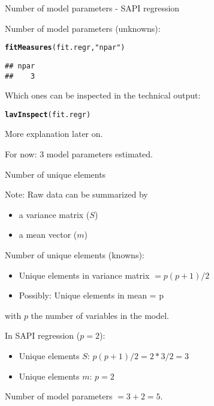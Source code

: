 \documentclass[10pt]{beamer}\usepackage[]{graphicx}\usepackage[]{xcolor}
\makeatletter
\newcommand{\hlstr}[1]{\textcolor[rgb]{0.192,0.494,0.8}{#1}}%
\newcommand{\hlstd}[1]{\textcolor[rgb]{0.345,0.345,0.345}{#1}}%
\newcommand{\hlkwd}[1]{\textcolor[rgb]{0.737,0.353,0.396}{\textbf{#1}}}%
\newenvironment{kframe}{%
 \def\at@end@of@kframe{}%
 \ifinner\ifhmode%
  \def\at@end@of@kframe{\end{minipage}}%
  \begin{minipage}{\columnwidth}%
 \fi\fi%
 \def\FrameCommand##1{\hskip\@totalleftmargin \hskip-\fboxsep
 \colorbox{shadecolor}{##1}\hskip-\fboxsep
     \hskip-\linewidth \hskip-\@totalleftmargin \hskip\columnwidth}%
 \MakeFramed {\advance\hsize-\width
   \@totalleftmargin\z@ \linewidth\hsize
   \@setminipage}}%
 {\par\unskip\endMakeFramed%
 \at@end@of@kframe}
\newenvironment{knitrout}{}{} %
\makeatother
\begin{document}
%
\begin{frame}[fragile]{Number of model parameters - SAPI regression}

Number of model parameters (unknowns):
\begin{knitrout}
\color{fgcolor}\begin{kframe}
\begin{alltt}
\hlkwd{fitMeasures}\hlstd{(fit.regr,} \hlstr{"npar"}\hlstd{)}
\end{alltt}
\begin{verbatim}
## npar 
##    3
\end{verbatim}
\end{kframe}
\end{knitrout}

\vspace{5mm}

Which ones can be inspected in the technical output:
\begin{knitrout}
\color{fgcolor}\begin{kframe}
\begin{alltt}
\hlkwd{lavInspect}\hlstd{(fit.regr)}
\end{alltt}
\end{kframe}
\end{knitrout}
More explanation later on.

\vspace{5mm}

For now: 3 model parameters estimated.

\end{frame}
%
\begin{frame}{Number of unique elements}

Note: Raw data can be summarized by
\begin{itemize}
\item{a variance matrix ($S$)}
\item{a mean vector ($m$)}
\end{itemize}

\vspace{5mm}

Number of unique elements (knowns):
\begin{itemize}
\item{Unique elements in variance matrix $= p(p+1)/2$}
\item{Possibly: Unique elements in mean = p}
\end{itemize}
with $p$ the number of variables in the model.

\vspace{5mm}

In SAPI regression ($p = 2$):\\
\begin{itemize}
\item{Unique elements $S$: $p(p+1)/2 = 2*3/2 = 3$}
\item{Unique elements $m$: $p = 2$}
\end{itemize}
Number of model parameters $= 3+2 = 5$. 

\end{frame}
\end{document}
